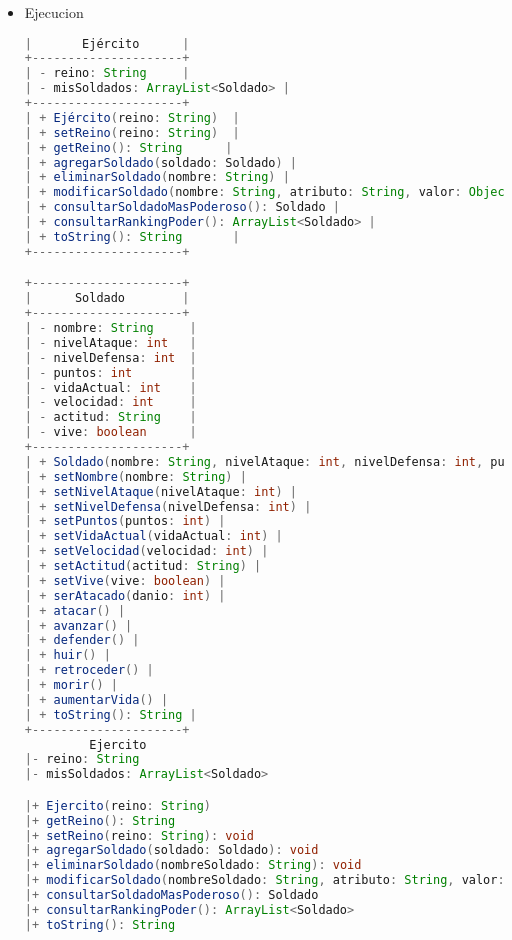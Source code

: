 \documentclass{article}
\begin{document}
\begin{itemize}
\begin{itemize}
        \\
        \\
        \texttt{[image: imagen1.jpeg]}
        \\
        \item Ejecucion
        \begin{lstlisting}[language=java]
|       Ejército      |
+---------------------+
| - reino: String     |
| - misSoldados: ArrayList<Soldado> |
+---------------------+
| + Ejército(reino: String)  |
| + setReino(reino: String)  |
| + getReino(): String      |
| + agregarSoldado(soldado: Soldado) |
| + eliminarSoldado(nombre: String) |
| + modificarSoldado(nombre: String, atributo: String, valor: Object) |
| + consultarSoldadoMasPoderoso(): Soldado |
| + consultarRankingPoder(): ArrayList<Soldado> |
| + toString(): String       |
+---------------------+

+---------------------+
|      Soldado        |
+---------------------+
| - nombre: String     |
| - nivelAtaque: int   |
| - nivelDefensa: int  |
| - puntos: int        |
| - vidaActual: int    |
| - velocidad: int     |
| - actitud: String    |
| - vive: boolean      |
+---------------------+
| + Soldado(nombre: String, nivelAtaque: int, nivelDefensa: int, puntos: int, vidaActual: int, velocidad: int, actitud: String) |
| + setNombre(nombre: String) |
| + setNivelAtaque(nivelAtaque: int) |
| + setNivelDefensa(nivelDefensa: int) |
| + setPuntos(puntos: int) |
| + setVidaActual(vidaActual: int) |
| + setVelocidad(velocidad: int) |
| + setActitud(actitud: String) |
| + setVive(vive: boolean) |
| + serAtacado(danio: int) |
| + atacar() |
| + avanzar() |
| + defender() |
| + huir() |
| + retroceder() |
| + morir() |
| + aumentarVida() |
| + toString(): String |
+---------------------+
         Ejercito
|- reino: String
|- misSoldados: ArrayList<Soldado>

|+ Ejercito(reino: String)
|+ getReino(): String
|+ setReino(reino: String): void
|+ agregarSoldado(soldado: Soldado): void
|+ eliminarSoldado(nombreSoldado: String): void
|+ modificarSoldado(nombreSoldado: String, atributo: String, valor: Object): void
|+ consultarSoldadoMasPoderoso(): Soldado
|+ consultarRankingPoder(): ArrayList<Soldado>
|+ toString(): String

        \end{lstlisting}
	\end{itemize}


\end{itemize}
\end{document}
